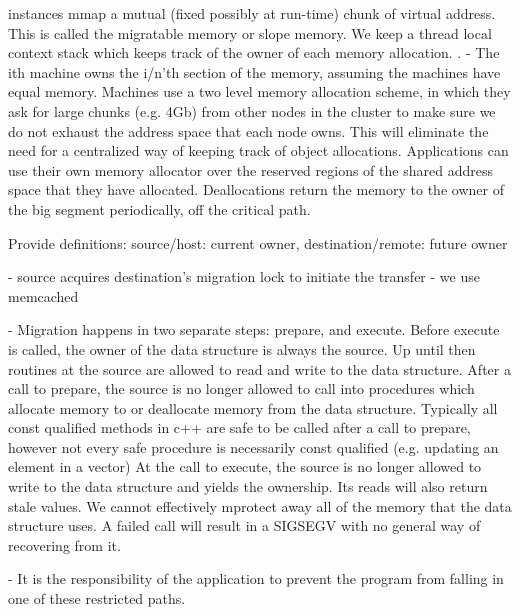 instances mmap a mutual (fixed possibly at run-time) chunk of virtual address. This is called the migratable memory or slope memory.
We keep a thread local context stack which keeps track of the owner of each memory allocation. .
- The ith machine owns the i/n'th section of the memory, assuming the machines have equal memory. Machines use a two level memory
allocation scheme, in which they ask for large chunks (e.g. 4Gb) from other nodes in the cluster to make sure we do not exhaust
the address space that each node owns. This will eliminate the need for a centralized way of keeping track of object allocations.
Applications can use their own memory allocator over the reserved regions of the shared address space that they have allocated.
Deallocations return the memory to the owner of the big segment periodically, off the critical path. 

Provide definitions: source/host: current owner, destination/remote: future owner

- source acquires destination's migration lock to initiate the transfer
    - we use memcached

- Migration happens in two separate steps: prepare, and execute. Before execute
  is called, the owner of the data structure is always the source. Up until then
  routines at the source are allowed to read and write to the data structure.
  After a call to prepare, the source is no longer allowed to call into
  procedures which allocate memory to or deallocate memory from the data structure. Typically all const qualified methods in c++ 
  are safe to be called after a call to prepare, however not every safe procedure is necessarily const qualified (e.g. updating an element in a vector)
  At the call to execute, the source is no longer allowed to write to the data structure and yields the ownership. Its reads will also return stale values.
  We cannot effectively mprotect away all of the memory that the data structure uses. A failed call will result in a SIGSEGV with no general way of
  recovering from it.

  - It is the responsibility of the application to prevent the program from falling in one of these restricted paths.



